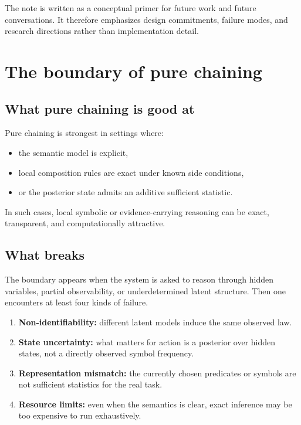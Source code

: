 \documentclass[11pt]{article}
\begin{document}
The note is written as a conceptual primer for future work and future
conversations.  It therefore emphasizes design commitments, failure modes, and
research directions rather than implementation detail.

\section{The boundary of pure chaining}

\subsection{What pure chaining is good at}

Pure chaining is strongest in settings where:
\begin{itemize}
  \item the semantic model is explicit,
  \item local composition rules are exact under known side conditions,
  \item or the posterior state admits an additive sufficient statistic.
\end{itemize}

In such cases, local symbolic or evidence-carrying reasoning can be exact,
transparent, and computationally attractive.

\subsection{What breaks}

The boundary appears when the system is asked to reason through hidden
variables, partial observability, or underdetermined latent structure.  Then
one encounters at least four kinds of failure.
\begin{enumerate}
  \item \textbf{Non-identifiability:} different latent models induce the same
        observed law.
  \item \textbf{State uncertainty:} what matters for action is a posterior over
        hidden states, not a directly observed symbol frequency.
  \item \textbf{Representation mismatch:} the currently chosen predicates or
        symbols are not sufficient statistics for the real task.
  \item \textbf{Resource limits:} even when the semantics is clear, exact
        inference may be too expensive to run exhaustively.
\end{enumerate}
\end{document}
